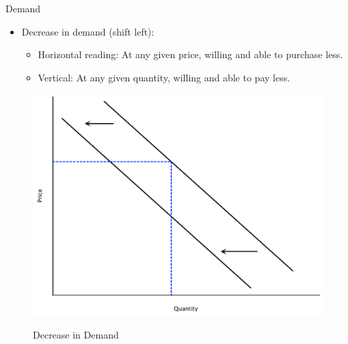 \documentclass[xcolor={dvipsnames},pdf, hyperref={colorlinks=true, citecolor=ForestGreen, linkcolor=BlueViolet, urlcolor=Magenta}]{beamer}
\theoremstyle{definition}
\newcommand{\blank}[0]{}
\newcommand{\ddp}[1]{{\textcolor{ForestGreen}{#1}}}
\begin{document}
\begin{frame}[b]{Demand}
	\begin{itemize}
	\item Decrease in demand (shift left):
\begin{itemize} 
	\item Horizontal reading: At any given price, willing and able to purchase less.
	\item Vertical: At any given quantity, willing and able to pay less. 
\end{itemize}
	\end{itemize}
	\blank 
	\blank 
	\blank 
	\blank
			\begin{figure}
				\centering
				\ddp{\includegraphics[scale=.25]{plot10.pdf}}
				\caption{Decrease in Demand}
			\end{figure}
\end{frame}

	
	
\end{document}
